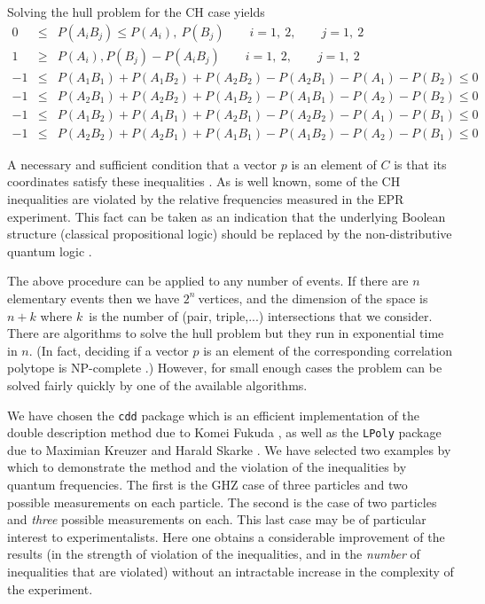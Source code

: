 Solving the hull problem for the CH case yields
\begin{eqnarray}
0&\leq & P(A_{i}B_{j})\leq P(A_{i}),\ P(B_{j}) \qquad  i=1,\ 2,\qquad  j=1,\ 2
\nonumber \\
1&\geq & P(A_{i}), P(B_{j})-P(A_{i}B_{j})\qquad i=1,\ 2,\qquad j=1,\ 2
\nonumber \\
-1&\leq& P(A_{1}B_{1})+P(A_{1}B_{2})+P(A_{2}B_{2})-P(A_{2}B_{1})-P(A_{1})-P(B_{2}) \leq 0
\nonumber \\
-1&\leq&  P(A_{2}B_{1})+P(A_{2}B_{2})+P(A_{1}B_{2})-P(A_{1}B_{1})-P(A_{2})-P(B_{2})\leq 0
\nonumber \\
-1&\leq&  P(A_{1}B_{2})+P(A_{1}B_{1})+P(A_{2}B_{1})-P(A_{2}B_{2})-P(A_{1})-P(B_{1})\leq 0
\nonumber \\
-1&\leq&  P(A_{2}B_{2})+P(A_{2}B_{1})+P(A_{1}B_{1})-P(A_{1}B_{2})-P(A_{2})-P(B_{1})\leq 0
\nonumber
\end{eqnarray}

A necessary and sufficient condition that a vector $p$ is an element of $C$
 is that its coordinates satisfy
these inequalities \cite{pitowsky}.
As is well known, some of the CH inequalities are
violated by the relative
frequencies measured in the EPR experiment. This fact can be taken as an
indication that
the underlying Boolean structure (classical propositional logic) should be
replaced by the
non-distributive quantum logic \cite{pitowsky,svozil-ql}.

The above procedure can be applied to any number of events. If there are $n$
elementary events then we have $2^{n}\ $vertices, and the dimension of the
space is $n+k$ where
$k$\ is the number of (pair, triple,...) intersections that we consider.
There are algorithms to
solve the hull problem but they run in exponential time in $n$.
(In fact,
deciding if a vector $p$
is an element of the corresponding correlation polytope is NP-complete \cite{Pit-91}.)
However, for small enough cases the problem can be solved fairly quickly by
one of the
available algorithms.

We have chosen the {\tt cdd} package \cite{cdd-pck} which is an efficient
implementation of the double description method  \cite{MRTT53}
due to Komei Fukuda \cite{FP96,fukuda-94,fukuda-pr},
as well as the {\tt LPoly} package due to Maximian Kreuzer and Harald Skarke \cite{kreuzer-skarke}.
We have selected two examples by which to demonstrate the method and the
violation
of the inequalities by quantum frequencies. The first is the GHZ case of
three particles
and two possible measurements on each particle. The second is the case of
two particles
and {\em three} possible measurements on each. This last case
may be of particular interest to
experimentalists. Here one obtains a considerable improvement of the results
(in the strength
of violation of the inequalities, and in the {\em number} of inequalities
that are violated) without
an intractable increase in the complexity of the experiment.







